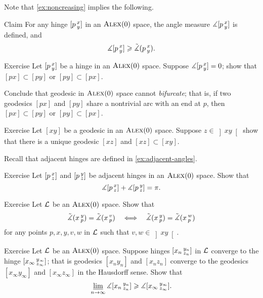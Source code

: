 Note that \ref{ex:noncreasing} implies the following.

\begin{thm}{Claim}\label{clm:angle-defined}
For any hinge $[p\,{}^{x}_{y}]$ in an $\textsc{Alex}(0)$ 
space,
the angle measure $\measuredangle[p\,{}^{x}_{y}]$ is defined, and
\[\measuredangle[p\,{}^{x}_{y}]\geqslant \tilde\measuredangle(p\,{}^{x}_{y}).\]

\end{thm}

\begin{thm}{Exercise}\label{ex:0-angle}
Let $[p\,{}^{x}_{y}]$ be a hinge in an $\textsc{Alex}(0)$ space.
Suppose $\measuredangle[p\,{}^{x}_{y}]=0$; show that $[px]\subset [py]$ or $[py]\subset [px]$.

Conclude that geodesic in $\textsc{Alex}(0)$ space cannot \emph{bifurcate};
that is, if two geodesics $[px]$ and $[py]$ share a nontrivial arc with an end at $p$, then $[px]\subset [py]$ or $[py]\subset [px]$.
\end{thm}

\begin{thm}{Exercise}\label{ex:pi-angle}
Let $[xy]$ be a geodesic in an $\textsc{Alex}(0)$ space.
Suppose $z\in \left]xy\right[$ show that there is a unique geodesic $[xz]$ and $[xz]\subset [xy]$.
\end{thm}

Recall that adjacent hinges are defined in \ref{ex:adjacent-angles}.

\begin{thm}{Exercise}\label{ex:adjacent-CBB}
Let $[p\,{}^{x}_{z}]$ and $[p\,{}^{y}_{z}]$ be adjacent hinges in an $\textsc{Alex}(0)$ 
space.
Show that
\[\measuredangle[p\,{}^{x}_{z}]+\measuredangle[p\,{}^{y}_{z}]= \pi.\]
\end{thm}


\begin{thm}{Exercise}\label{ex:pxyvw}
Let $\mathcal{L}$ be an $\textsc{Alex}(0)$ 
space.
Show that  
\[
\tilde\measuredangle(x\,{}^{y}_{p})=\tilde\measuredangle(x\,{}^{v}_{p})
\quad\Longleftrightarrow\quad
\tilde\measuredangle(x\,{}^{y}_{p})=\tilde\measuredangle(x\,{}^{w}_{p})
\]
for any points
$p,x,y,v,w$ in $\mathcal{L}$ such that $v,w\in \left]xy\right[$.
\end{thm}

\begin{thm}{Exercise}\label{ex:angle-lim}
Let $\mathcal{L}$ be an $\textsc{Alex}(0)$ space.
Suppose hinges $[x_n\,{}^{y_n}_{z_n}]$ in $\mathcal{L}$ converge to the hinge $[x_\infty\,{}^{y_\infty}_{z_\infty}]$;
that is geodesics $[x_ny_n]$ and $[x_nz_n]$ converge to the geodesics $[x_\infty y_\infty]$ and $[x_\infty z_\infty]$ in the Hausdorff sense.
Show that 
\[\varliminf_{n\to\infty}\measuredangle [x_n\,{}^{y_n}_{z_n}]\geqslant \measuredangle [x_\infty\,{}^{y_\infty}_{z_\infty}].\]
\end{thm}

